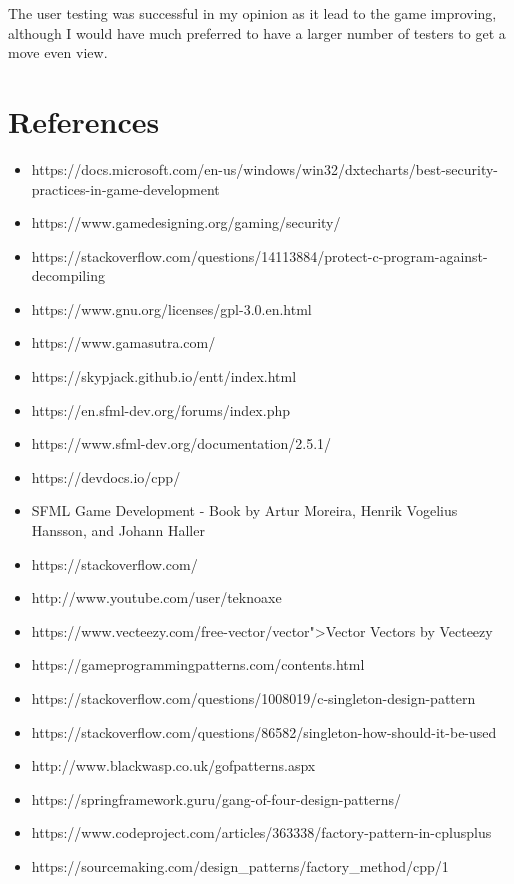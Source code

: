 \documentclass{article}
\begin{document}
The user testing was successful in my opinion as it lead to the game improving, although I would have much preferred to have a larger number of testers to get a move even view.

\newpage
\section{References}

\begin{itemize}
    \item https://docs.microsoft.com/en-us/windows/win32/dxtecharts/best-security-practices-in-game-development
    \item https://www.gamedesigning.org/gaming/security/
    \item https://stackoverflow.com/questions/14113884/protect-c-program-against-decompiling
    \item https://www.gnu.org/licenses/gpl-3.0.en.html
    \item https://www.gamasutra.com/
    \item https://skypjack.github.io/entt/index.html
    \item https://en.sfml-dev.org/forums/index.php
    \item https://www.sfml-dev.org/documentation/2.5.1/
    \item https://devdocs.io/cpp/
    \item SFML Game Development - Book by Artur Moreira, Henrik Vogelius Hansson, and Johann Haller
    \item https://stackoverflow.com/
    \item http://www.youtube.com/user/teknoaxe
    \item https://www.vecteezy.com/free-vector/vector">Vector Vectors by Vecteezy
    \item https://gameprogrammingpatterns.com/contents.html
    \item https://stackoverflow.com/questions/1008019/c-singleton-design-pattern
    \item https://stackoverflow.com/questions/86582/singleton-how-should-it-be-used
    \item http://www.blackwasp.co.uk/gofpatterns.aspx
    \item https://springframework.guru/gang-of-four-design-patterns/
    \item https://www.codeproject.com/articles/363338/factory-pattern-in-cplusplus
    \item https://sourcemaking.com/design\_patterns/factory\_method/cpp/1

\end{itemize}
\end{document}
